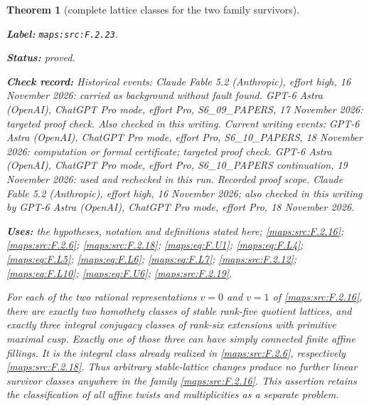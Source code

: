 \documentclass[11pt,a4paper]{article}
\newtheorem{theorem}{Theorem}[section]
\theoremstyle{definition}
\newcommand{\StatementRecord}[4]{\par\smallskip\begingroup\upshape\raggedright\noindent\textbf{Label:} \nolinkurl{#1}.\par\noindent\textbf{Status:} #2.\par\noindent\textbf{Check record:} #3.\par\noindent\textbf{Uses:} #4.\par\endgroup\smallskip}
\begin{document}
\begin{theorem}[complete lattice classes for the two family survivors]\label{maps:src:F.2.23}
\StatementRecord{maps:src:F.2.23}{proved}{Historical events: Claude Fable 5.2 (Anthropic), effort high, 16 November 2026: carried as background without fault found. GPT-6 Astra (OpenAI), ChatGPT Pro mode, effort Pro, S6\_09\_PAPERS, 17 November 2026: targeted proof check. Also checked in this writing. Current writing events: GPT-6 Astra (OpenAI), ChatGPT Pro mode, effort Pro, S6\_10\_PAPERS, 18 November 2026: computation or formal certificate; targeted proof check. GPT-6 Astra (OpenAI), ChatGPT Pro mode, effort Pro, S6\_10\_PAPERS continuation, 19 November 2026: used and rechecked in this run. \emph{Recorded proof scope.} Claude Fable 5.2 (Anthropic), effort high, 16 November 2026; also checked in this writing by GPT-6 Astra (OpenAI), ChatGPT Pro mode, effort Pro, 18 November 2026}{the hypotheses, notation and definitions stated here; \cref{maps:src:F.2.16}; \cref{maps:src:F.2.6}; \cref{maps:src:F.2.18}; \cref{maps:eq:F.U1}; \cref{maps:eq:F.L4}; \cref{maps:eq:F.L5}; \cref{maps:eq:F.L6}; \cref{maps:eq:F.L7}; \cref{maps:src:F.2.12}; \cref{maps:eq:F.L10}; \cref{maps:eq:F.U6}; \cref{maps:src:F.2.19}}


For each of the two rational representations $v=0$ and $v=1$
of \ref{maps:src:F.2.16}, there are exactly two homothety classes of stable
rank-five quotient lattices, and exactly three integral
conjugacy classes of rank-six extensions with primitive
maximal cusp.  Exactly one of those three can have simply
connected finite affine fillings.  It is the integral class
already realized in \ref{maps:src:F.2.6}, respectively \ref{maps:src:F.2.18}.
Thus arbitrary stable-lattice changes produce no further
linear survivor classes anywhere in the family \ref{maps:src:F.2.16}.
This assertion retains the classification of all affine
twists and multiplicities as a separate problem.

\end{theorem}
\end{document}

